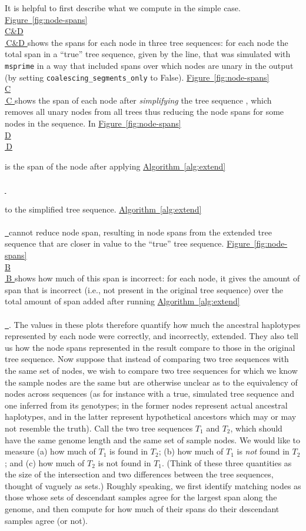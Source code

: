 \documentclass[10pt,twoside,lineno]{gsajnl}
\newcommand{\msprime}{\texttt{msprime}}
\newcommand{\algorithmref}[2][]{%
	\hyperref[{#2}]{%
		Algorithm~\ref*{#2}%
		\ifx\\#1\\%
		\else
		\,#1%
		\fi
	}%
}
\newcommand*{\figref}[2][]{%
	\hyperref[{#2}]{%
		Figure~\ref*{#2}%
		\ifx\\#1\\%
		\else
		\,#1%
		\fi
	}%
}
\begin{document}
It is helpful to first describe what we compute in the simple case.
\figref[C\&D]{fig:node-spans} shows the spans for each node in three tree sequences:
for each node the total span in a ``true'' tree sequence, 
given by the line,
that was simulated with \msprime \citep{kelleher2016efficient,baumdicker2021efficient}
in a way that included spans over which nodes are unary in the output
(by setting \texttt{coalescing\_segments\_only} to False).
\figref[C]{fig:node-spans} shows the span of each node after \emph{simplifying} the tree sequence 
\citep{kelleher2018efficient},
which removes all unary nodes from all trees
thus reducing the node spans for some nodes in the sequence.
In \figref[D]{fig:node-spans}
is the span of the node after applying \algorithmref{alg:extend}
to the simplified tree sequence.
\algorithmref{alg:extend} cannot reduce node span, resulting in node spans 
from the extended tree sequence that are closer in value to the ``true'' tree sequence. 
\figref[B]{fig:node-spans} shows how much of this span is incorrect:
for each node, it gives the amount of span
that is incorrect (i.e., not present in the original tree sequence) %
over the total amount of span added after running \algorithmref{alg:extend}.
The values in these plots
therefore quantify how much the ancestral haplotypes represented by each node
were correctly, and incorrectly, extended.
They also tell us how the node spans represented in the result compare to those in the original tree sequence. %
Now suppose that instead of comparing two tree sequences with the same set of nodes,
we wish to compare two tree sequences for which we know the sample nodes are the same
but are otherwise unclear as to the equivalency of nodes across sequences
(as for instance with a true, simulated tree sequence and one inferred from its genotypes;
in the former nodes represent actual ancestral haplotypes, and in the latter
represent hypothetical ancestors which may or may not resemble the truth).
Call the two tree sequences $T_1$ and $T_2$, which should have the same genome length
and the same set of sample nodes.
We would like to measure (a) how much of $T_1$ is found in $T_2$;
(b) how much of $T_1$ is \emph{not} found in $T_2$; and
(c) how much of $T_2$ is not found in $T_1$.
(Think of these three quantities as the size of the intersection
and two differences between the tree sequences,
thought of vaguely as sets.)
Roughly speaking, we first identify matching nodes
as those whose sets of descendant samples agree for the largest span along the genome,
and then compute for how much of their spans do their descendant samples agree (or not).
\end{document}
